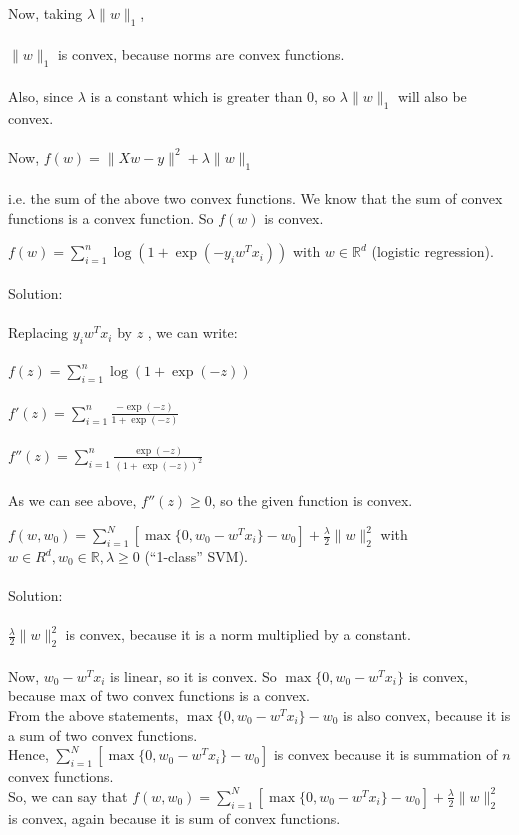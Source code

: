 \documentclass{article}
\def\blu#1{{\color{blu}#1}}
\def\red#1{{\color{red}#1}}
\def\norm#1{\|#1\|}
\def\R{\mathbb{R}}
\begin{document}
{{Now, taking $\lambda\norm{w}_1$, \\ \\
$\norm{w}_1$ is convex, because norms are convex functions. \\ \\
Also, since $\lambda$ is  a constant which is greater than 0, so $\lambda\norm{w}_1$ will also be convex. \\ \\
Now, $f(w) = \norm{Xw-y}^2 + \lambda\norm{w}_1$ \\ \\
i.e. the sum of the above two convex functions. 
We know that the sum of convex functions is a convex function. So $f(w)$ is convex. } \\
\item $f(w) = \sum_{i=1}^n \log(1+\exp(-y_iw^Tx_i)) $ with $w \in \R^d$ (logistic regression). \\ \\
\blu{Solution: \\ \\
Replacing $y_iw^Tx_i$ by $z$ , we can write: \\ \\
$f(z) = \sum_{i=1}^n \log(1+\exp(-z))$ \\ \\
$ f'(z) = \sum_{i=1}^n \frac{- \exp(-z)}{1 + \exp(-z)}$ \\ \\
$ f''(z) = \sum_{i=1}^n \frac{\exp(-z)}{(1+ \exp(-z))^2} $ \\ \\
As we can see above, $f''(z) \geq 0$, so the given function is convex. \\
}
\item $f(w,w_0) = \sum_{i=1}^N[\max\{0,w_0 - w^Tx_i\} - w_0] + \frac{\lambda}{2}\norm{w}_2^2$  with $w \in R^d, w_0 \in \R, \lambda \geq 0$ (``1-class'' SVM). \\ \\
\blu{ Solution: \\ \\
\red{$\frac{\lambda}{2}\norm{w}_2^2$} is convex, because it is a norm multiplied by a constant. \\ \\
Now, $w_0 - w^Tx_i$ is linear, so it is convex. So \red{$\max\{0,w_0 - w^Tx_i\}$} is convex, because max of two convex functions is a convex.\\
From the above statements, \red{$\max\{0,w_0 - w^Tx_i\} - w_0$} is also convex, because it is a sum of two convex functions. \\
Hence, \red{$\sum_{i=1}^N[\max\{0,w_0 - w^Tx_i\} - w_0]$} is convex because it is summation of $n$ convex functions. \\
So, we can say that \red{$f(w,w_0) = \sum_{i=1}^N[\max\{0,w_0 - w^Tx_i\} - w_0] + \frac{\lambda}{2}\norm{w}_2^2$} is convex, again because it is sum of convex functions.
}
}
\end{document}
